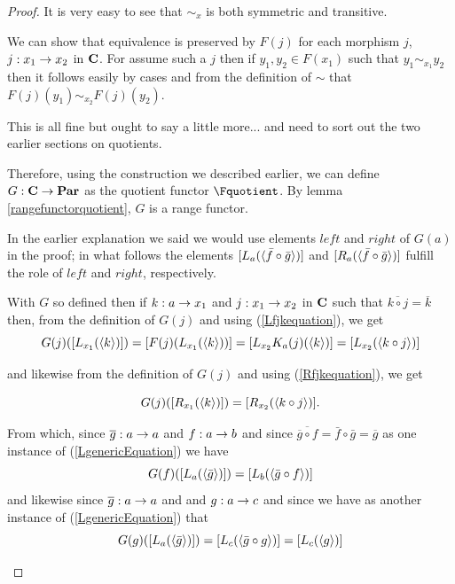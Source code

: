 \begin{proof}
It is very easy to see that $\sim_x$  is both symmetric and transitive. 

We can show that equivalence is preserved by  $F(j)$ for each morphism $j$, $j: x_1 \rightarrow x_2$ in $\textbf{C}$. For assume such a $j$ then 
if $y_1,y_2 \in F(x_1)$ such that $y_1 \sim_{x_1} y_2$
then it follows easily by cases and from the definition of $\sim$ that $F(j)(y_1) \sim_{x_2} F(j)(y_2)$.
\begin{worktt}This is all fine but ought to say a little more...
and need to sort out the two earlier sections on quotients.
\end{worktt}

Therefore, using the construction we described earlier, 
we can define 
 $G: \textbf{C} \rightarrow \textbf{Par}$  as the quotient functor $\Fquotient$.
By lemma \ref{rangefunctorquotient}, $G$ is a range functor.

In the earlier explanation we said we would use elements $left$ and $right$ of $G(a)$
in the proof; in what follows
the elements
$[L_a(\langle\bar{f}\circ \bar{g}\rangle)]$ and $[R_a(\langle\bar{f}\circ \bar{g}\rangle)]$ fulfill the role of $left$ and $right$, respectively.

\begin{newtt}
With $G$ so defined then if $k: a \rightarrow x_1$ and $j:x_1 \rightarrow x_2$ in $\textbf{C}$ such that $\overline{k \circ j}=\overline{k}$
then, from the definition of $G(j)$ and using  (\ref{Lfjkequation}), we get
\begin{equation}
\label{LgenericEquation}
G(j)([L_{x_1}(\langle k\rangle)])
=[F(j)(L_{x_1}(\langle k\rangle))] 
= [L_{x_2}K_a(j)(\langle k\rangle)]  
=[L_{x_2}(\langle k \circ j\rangle)]
\end{equation}

 and likewise from the definition of $G(j)$ and using  (\ref{Rfjkequation}), we get


\begin{equation} 
G(j)([R_{x_1}(\langle k\rangle)])=[R_{x_2}(\langle k \circ j\rangle)].
\end{equation} 

From which, since $\overline{g}: a \rightarrow a$ and $f:a \rightarrow b$  
and since $\overline{\overline{g}\circ f} = \bar{f} \circ \bar{g} = \overline{g}$
as one instance of (\ref{LgenericEquation}) we have 
\begin{equation}
\label{Lfequation}
G(f)([L_a(\langle\bar{g}\rangle)])=[L_{b}(\langle\bar{g} \circ f\rangle)]
\end{equation}
and likewise since $\overline{g}: a \rightarrow a$ and  and $g:a \rightarrow c$  
and since 
 we have as another instance of (\ref{LgenericEquation}) that
\begin{equation}
\label{Lgequation}
G(g)([L_a(\langle\bar{g}\rangle)])=[L_{c}(\langle\bar{g} \circ g\rangle)]=[L_{c}(\langle g\rangle)]
\end{equation}
\end{newtt}


\end{proof}
